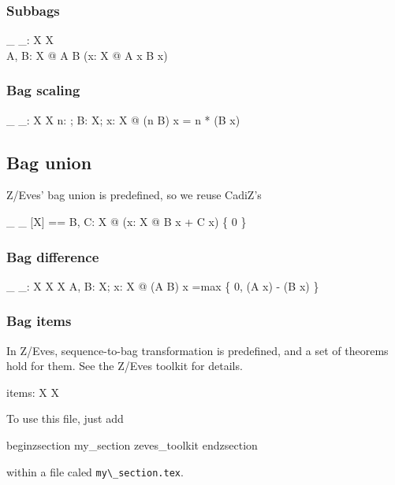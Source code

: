 \documentclass[draft,a4paper,10pt,wd]{article}
\begin{document}
\subsubsection*{Subbags}

\begin{gendef}[X]
  \_ \subbageq \_: \bag X \rel \bag X \\
\where
  \forall A, B: \bag X @ A \subbageq B \iff
	(\forall x: X @ A \bcount x \leq B \bcount x)
\end{gendef}

\subsubsection*{Bag scaling}

\begin{gendef}[X]
  \_ \otimes \_: \nat \cross \bag X \fun \bag X
\where
  \forall n: \nat; B: \bag X; x: X @
     (n \otimes B) \bcount x = n * (B \bcount x)
\end{gendef}

\subsection*{Bag union }

Z/Eves' bag union is predefined, so we reuse CadiZ's
\begin{zed}
\_ \uplus \_ [X] == \lambda B, C: \bag X @ (\lambda x: X @ B \bcount x + C \bcount x) \nrres \{ 0 \}
\end{zed}

\subsubsection*{Bag difference}

\begin{gendef}[X]
  \_ \uminus \_: \bag X \cross \bag X \fun \bag X
\where
  \forall A, B: \bag X; x: X @
     (A \uminus B) \bcount x =max \{ 0, (A \bcount x) - (B \bcount x) \}
\end{gendef}

\subsubsection*{Bag items}

In Z/Eves, sequence-to-bag transformation is predefined, and a set
of theorems hold for them. See the Z/Eves toolkit for details.
%
\begin{gendef}[X]
  items: \seq X \fun \bag X
\end{gendef}

To use this file, just add

begin{zsection}
\SECTION my\_section \parents zeves\_toolkit
end{zsection}

within a file caled \verb'my\_section.tex'.
\end{document}
